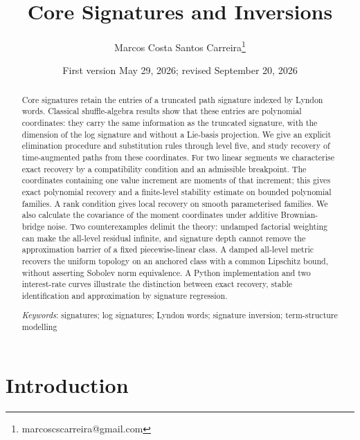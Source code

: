 \documentclass[11pt,english]{article}
\theoremstyle{definition}
\theoremstyle{remark}
\begin{document}
\title{Core Signatures and Inversions}
\author{Marcos Costa Santos Carreira\thanks{marcoscscarreira@gmail.com}}
\date{First version May 29, 2026; revised September 20, 2026}
\maketitle


\begin{abstract}
Core signatures retain the entries of a truncated path signature
indexed by Lyndon words. Classical shuffle-algebra results show that
these entries are polynomial coordinates: they carry the same
information as the truncated signature, with the dimension of the
log signature and without a Lie-basis projection. We give an explicit
elimination procedure and substitution rules through level five, and
study recovery of time-augmented paths from these coordinates.
For two linear segments we characterise exact recovery by a
compatibility condition and an admissible breakpoint. The coordinates
containing one value increment are moments of that increment; this
gives exact polynomial recovery and a finite-level stability estimate
on bounded polynomial families. A rank condition gives local recovery
on smooth parameterised families. We also calculate the covariance of
the moment coordinates under additive Brownian-bridge noise.
Two counterexamples delimit the theory: undamped factorial weighting
can make the all-level residual infinite, and signature depth cannot
remove the approximation barrier of a fixed piecewise-linear class.
A damped all-level metric recovers the uniform topology on an anchored
class with a common Lipschitz bound, without asserting Sobolev norm
equivalence. A Python implementation and two interest-rate curves illustrate
the distinction between exact recovery, stable identification and
approximation by signature regression.

\medskip{}
\textit{Keywords}: signatures; log signatures; Lyndon words; signature
inversion; term-structure modelling
\end{abstract}

\section{Introduction}
\end{document}
